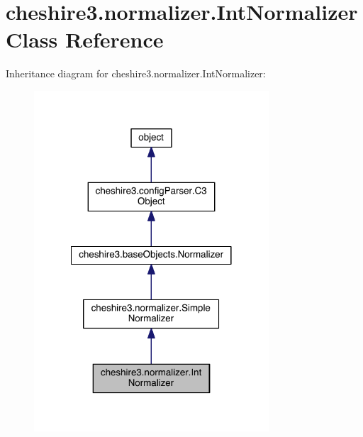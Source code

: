 \hypertarget{classcheshire3_1_1normalizer_1_1_int_normalizer}{\section{cheshire3.\-normalizer.\-Int\-Normalizer Class Reference}
\label{classcheshire3_1_1normalizer_1_1_int_normalizer}
}


Inheritance diagram for cheshire3.\-normalizer.\-Int\-Normalizer\-:
\nopagebreak
\begin{figure}[H]
\begin{center}
\leavevmode
\includegraphics[width=248pt]{classcheshire3_1_1normalizer_1_1_int_normalizer__inherit__graph}
\end{center}
\end{figure}


